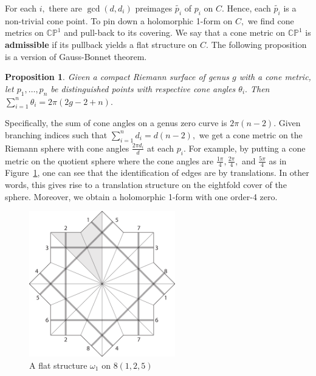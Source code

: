 \documentclass[12pt,reqno]{amsart}
\newtheorem*{proposition}{Proposition}
\theoremstyle{definition}
\theoremstyle{remark}
\begin{document}

For each $i,$ there are $\gcd(d, d_i)$ preimages $\widetilde{p_i}$ of $p_i$ on $C.$ Hence, each $\widetilde{p_i}$ is a non-trivial cone point. To pin down a holomorphic 1-form on $C,$ we find cone metrics on $\mathbb{C}\mathbb{P}^1$ and pull-back to its covering. We say that a cone metric on $\mathbb{C}\mathbb{P}^1$ is \textbf{admissible} if its pullback yields a flat structure on $C.$ The following proposition is a version of Gauss-Bonnet theorem.

\begin{proposition} Given a compact Riemann surface of genus $g$ with a cone metric, let $p_1, \ldots, p_n$ be distinguished points with respective cone angles $\theta_i.$ Then $\sum\limits_{i=1}^n \theta_i = 2 \pi (2 g - 2 + n).$
\end{proposition}

Specifically, the sum of cone angles on a genus zero curve is $2 \pi (n - 2).$ Given branching indices such that $\sum\limits_{i=1}^n d_i = d (n - 2),$ we get a cone metric on the Riemann sphere with cone angles $\frac{2 \pi d_i}{d}$ at each $p_i.$ For example, by putting a cone metric on the quotient sphere where the cone angles are $\frac{1 \pi}{4}, \frac{2 \pi}{4},$ and $\frac{5 \pi}{4}$ as in Figure~\ref{fig:125_flat}, one can see that the identification of edges are by translations. In other words, this gives rise to a translation structure on the eightfold cover of the sphere. Moreover, we obtain a holomorphic 1-form with one order-4 zero.

\begin{figure}[htbp]
   \centering
   \includegraphics[width=2.5in]{figures/125_flat.pdf} 
	\caption{A flat structure $\omega_1$ on $8(1, 2, 5)$}
	\label{fig:125_flat}
\end{figure}
\end{document}
